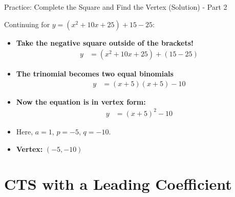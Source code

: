 \documentclass[aspectratio=169]{beamer}
\begin{document}
\begin{frame}{Practice: Complete the Square and Find the Vertex (Solution) - Part 2}
    \begin{tcolorbox}[colback=lightgray,colframe=accent,title=Solution - Part 2 (Cont.)]
        \footnotesize
        Continuing for $y = (x^2 + 10x + 25) + 15 - 25$:
        \begin{itemize}
            \item \textbf{Take the negative square outside of the brackets!}
                \begin{align*}
                    y &= (x^2 + 10x + 25) + (15 - 25)
                \end{align*}
            \item \textbf{The trinomial becomes two equal binomials}
                \begin{align*}
                    y &= (x+5)(x+5) - 10
                \end{align*}
            \item \textbf{Now the equation is in vertex form:}
                \begin{align*}
                    y &= (x+5)^2 - 10
                \end{align*}
            \item Here, $a=1$, $p=-5$, $q=-10$.
            \item \textbf{Vertex:} $(-5, -10)$
        \end{itemize}
    \end{tcolorbox}
\end{frame}

\section{CTS with a Leading Coefficient}
\end{document}

